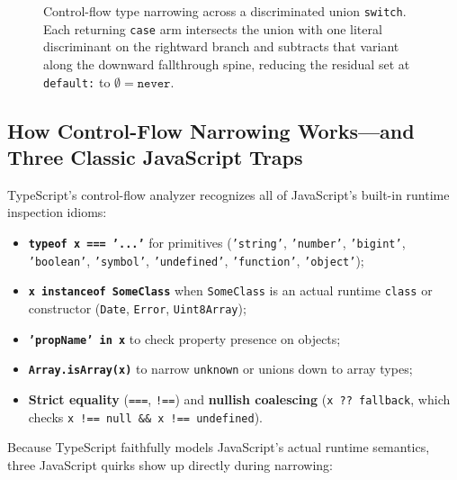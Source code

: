 \begin{figure}[H]
\caption{Control-flow type narrowing across a discriminated union \texttt{switch}. Each returning \texttt{case} arm intersects the union with one literal discriminant on the rightward branch and subtracts that variant along the downward fallthrough spine, reducing the residual set at \texttt{default:} to $\emptyset = \texttt{never}$.}
\label{ch09:fig-cfa-narrowing}
\end{figure}

\subsection{How Control-Flow Narrowing Works---and Three Classic JavaScript Traps}

TypeScript's control-flow analyzer recognizes all of JavaScript's built-in runtime inspection idioms:
\begin{itemize}
  \item \textbf{\texttt{typeof x === '...'}} for primitives (\texttt{'string'}, \texttt{'number'}, \texttt{'bigint'}, \texttt{'boolean'}, \texttt{'symbol'}, \texttt{'undefined'}, \texttt{'function'}, \texttt{'object'});
  \item \textbf{\texttt{x instanceof SomeClass}} when \texttt{SomeClass} is an actual runtime \texttt{class} or constructor (\texttt{Date}, \texttt{Error}, \texttt{Uint8Array});
  \item \textbf{\texttt{'propName' in x}} to check property presence on objects;
  \item \textbf{\texttt{Array.isArray(x)}} to narrow \texttt{unknown} or unions down to array types;
  \item \textbf{Strict equality} (\texttt{===}, \texttt{!==}) and \textbf{nullish coalescing} (\texttt{x ?? fallback}, which checks \texttt{x !== null \&\& x !== undefined}).
\end{itemize}

Because TypeScript faithfully models JavaScript's actual runtime semantics, three JavaScript quirks show up directly during narrowing:

